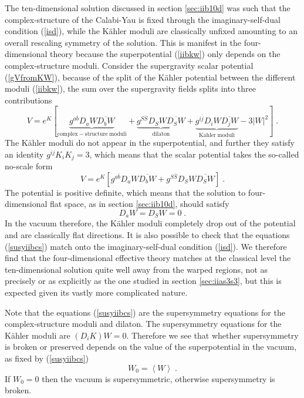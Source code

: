 \documentclass[11pt,a4paper]{article}
\numberwithin{equation}{section}
\numberwithin{table}{section}\setlength{\multlinegap}{25pt}
\newcommand{\be}{\begin{equation}}
\newcommand{\ee}{\end{equation}}
\begin{document}
The ten-dimensional solution discussed in section \ref{sec:iib10d} was such that the complex-structure of the Calabi-Yau is fixed through the imaginary-self-dual condition (\ref{isd}), while the K{\"a}hler moduli are classically unfixed amounting to an overall rescaling symmetry of the solution. This is manifest in the four-dimensional theory because the superpotential (\ref{iibkw}) only depends on the complex-structure moduli. Consider the supergravity scalar potential (\ref{gVfromKW}), because of the split of the K{\"a}hler potential between the different moduli (\ref{iibkw}), the sum over the supergravity fields splits into three contributions
\be
V = e^K \left[ \underbrace{g^{a\bar{b}} D_a W \overline{D_b W}}_{\mathrm{complex-structure\;moduli}} +  \underbrace{g^{S\bar{S}} D_S W \overline{D_S W}}_{\mathrm{dilaton}}  +  \underbrace{g^{i\bar{j}} D_i W \overline{D_j W}}_{\mathrm{Kahler\;moduli}} - 3 \left|W\right|^2 \right] \;.
\ee
The K{\"a}hler moduli do not appear in the superpotential, and further they satisfy an identity \cite{Grimm:2004uq,Douglas:2006es} $g^{ij}K_i K_j =3$, which means that the scalar potential takes the so-called no-scale form
\be
V = e^K \left[ g^{a\bar{b}} D_a W \overline{D_b W} + g^{S\bar{S}} D_S W \overline{D_S W} \right] \;.
\ee
The potential is positive definite, which means that the solution to four-dimensional flat space, as in section  \ref{sec:iib10d}, should satisfy 
\be
\label{susyiibcs}
D_aW = D_SW = 0 \;.
\ee
In the vacuum therefore, the K{\"a}hler moduli completely drop out of the potential and are classically flat directions. It is also possible to check that the equations (\ref{susyiibcs}) match onto the imaginary-self-dual condition (\ref{isd}). We therefore find that the four-dimensional effective theory matches at the classical level the ten-dimensional solution quite well away from the warped regions, not as precisely or as explicitly as the one studied in section \ref{sec:iias3s3}, but this is expected given its vastly more complicated nature.

Note that the equations (\ref{susyiibcs}) are the supersymmetry equations for the complex-structure moduli and dilaton. The supersymmetry equations for the K{\"a}hler moduli are $\left(D_i K\right) W=0$. Therefore we see that whether supersymmetry is broken or preserved depends on the value of the superpotential in the vacuum, as fixed by (\ref{susyiibcs})
\be
\label{w0}
W_0 = \left< W\right> \;.
\ee
If $W_0 = 0$ then the vacuum is supersymmetric, otherwise supersymmetry is broken. 
\end{document}
